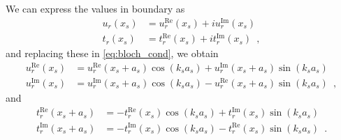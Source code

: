We can express the values in boundary as
\begin{align*}
u_r(x_s) &= u_r^\text{Re}(x_s) + i u_r^\text{Im}(x_s)\\
t_r(x_s) &= t_r^\text{Re}(x_s) + i t_r^\text{Im}(x_s) \enspace ,
\end{align*}
and replacing these in \eqref{eq:bloch_cond}, we obtain
\begin{subequations}
\begin{align}
u_r^\text{Re}(x_s) &= u_r^\text{Re}(x_s + a_s)\cos(k_s a_s) + u_r^\text{Im}(x_s + a_s)\sin(k_s a_s)\\
u_r^\text{Im}(x_s) &= u_r^\text{Im}(x_s + a_s)\cos(k_s a_s) - u_r^\text{Re}(x_s + a_s)\sin(k_s a_s) \enspace ,
\end{align}
\label{eq:real_bloch_disp}
\end{subequations}
and
\begin{subequations}
\begin{align}
t_r^\text{Re}(x_s + a_s) &= -t_r^\text{Re}(x_s)\cos(k_s a_s) + t_r^\text{Im}(x_s)\sin(k_s a_s)\\
t_r^\text{Im}(x_s + a_s) &= -t_r^\text{Im}(x_s)\cos(k_s a_s) - t_r^\text{Re}(x_s)\sin(k_s a_s) \enspace .
\end{align}
\label{eq:real_bloch_trac}
\end{subequations}

